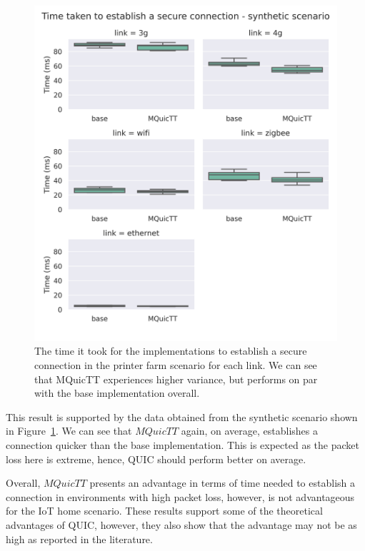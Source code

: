 \begin{figure}
    \centering
    \includegraphics[width=1\linewidth]{images/analysis_connection_time_synth.png}
    \caption{The time it took for the implementations to establish a secure connection in the printer farm scenario for each link.
        We can see that MQuicTT experiences higher variance, but performs on par with the base implementation overall.}
    \label{fig:connect_time_synth}
\end{figure}

This result is supported by the data obtained from the synthetic scenario shown in Figure~\ref{fig:connect_time_synth}.
We can see that $MQuicTT$ again, on average, establishes a connection quicker than the base implementation.
This is expected as the packet loss here is extreme, hence, QUIC should perform better on average.


Overall, $MQuicTT$ presents an advantage in terms of time needed to establish a connection in environments with high packet loss, however, is not advantageous for the IoT home scenario.
These results support some of the theoretical advantages of QUIC, however, they also show that the advantage may not be as high as reported in the literature.